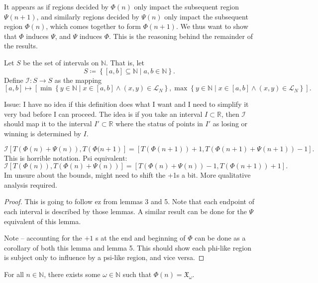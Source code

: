\documentclass[11pt, letterpaper]{article}
\begin{document}
It appears as if regions decided by $\Phi (n)$ only impact the subsequent region $\Psi (n+1)$, and similarly regions decided by $\Psi (n)$ only impact the subsequent region $\Phi (n)$, which comes together to form $\Phi (n+1)$. We thus want to show that $\Phi $ induces $\Psi $, and $\Psi $ induces $\Phi $. This is the reasoning behind the remainder of the results.
\begin{definition}[Inducing]\label{dfn:13}
	Let $S$ be the set of intervals on $\mathbb{N}$. That is, let
	\[
		S\coloneqq \left\{ [a,b] \subseteq \mathbb{N} \mid a,b\in\mathbb{N} \right\} 
	.\]
	Define $\mathcal{I} : S \to S$ as the mapping
	\[
		[a,b]\mapsto \left[ \min \left\{ y\in\mathbb{N} \mid x\in[a,b]\land (x,y)\in \mathcal{L}_N  \right\} ,\max \left\{ y\in\mathbb{N} \mid x\in[a,b]\land (x,y)\in \mathcal{L}_N \right\}  \right] 
	.\]
\end{definition}
Issue: I have no idea if this definition does what I want and I need to simplify it very bad before I can proceed. The idea is if you take an interval $I \subset \mathbb{R}$, then $\mathcal{I} $ should map it to the interval $I'\subset \mathbb{R}$ where the status of points in $I '$ as losing or winning is determined by $I$.
\begin{lemma}\label{lma:7}
	\[
		\mathcal{I} \left[ T\left( \Phi (n)+\Psi (n) \right) ,T\left( \Phi (n+1 \right)  \right] =\left[ T\left( \Phi (n+1) \right)+1 ,T\left( \Phi (n+1)+\Psi (n+1) \right) -1 \right] 
	.\]
	This is horrible notation. Psi equivalent:
	\[
		\mathcal{I} \left[ T(\Phi (n)),T(\Phi (n)+\Psi (n)) \right] =\left[ T(\Phi (n)+\Psi (n))-1,T(\Phi (n+1))+1 \right] 
	.\]
	Im unsure about the bounds, might need to shift the +1s a bit. More qualitative analysis required.
\end{lemma}
\begin{proof}
	This is going to follow ez from lemmas 3 and 5. Note that each endpoint of each interval is described by those lemmas. A similar result can be done for the $\Psi $ equivalent of this lemma.

	Note -- accounting for the $+1$ s at the end and beginning of $\Phi $ can be done as a corollary of both this lemma and lemma 5. This should show each phi-like region is subject only to influence by a psi-like region, and vice versa.
\end{proof}
\begin{theorem}\label{thm:5}
	For all $n\in\mathbb{N}$, there exists some $\omega \in\mathbb{N}$ such that $\Phi (n)=\mathfrak{X}_{\omega }$.
\end{theorem}
\end{document}
